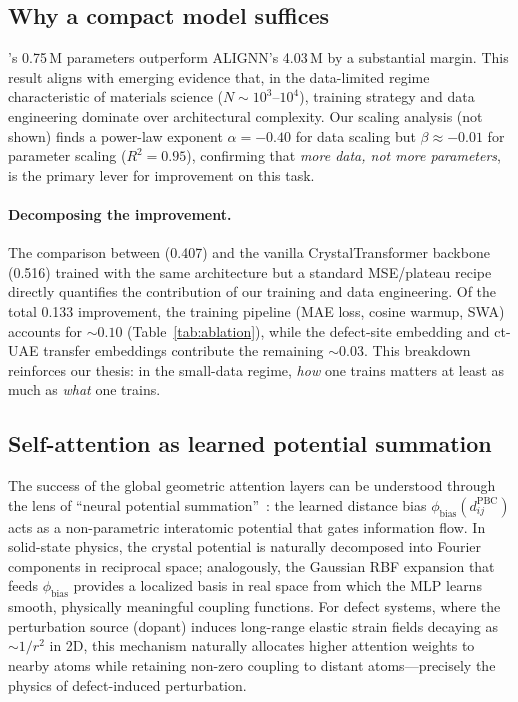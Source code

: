 
\subsection{Why a compact model suffices}

\dart{}'s 0.75\,M parameters outperform ALIGNN's 4.03\,M by a substantial
margin.
This result aligns with emerging evidence that, in the data-limited regime
characteristic of materials science ($N \sim 10^3$--$10^4$), training
strategy and data engineering dominate over architectural complexity.
Our scaling analysis (not shown) finds a power-law exponent
$\alpha = -0.40$ for data scaling but $\beta \approx -0.01$ for parameter
scaling ($R^2 = 0.95$), confirming that \emph{more data, not more
parameters}, is the primary lever for improvement on this task.

\paragraph{Decomposing the improvement.}
The comparison between \dart{} (0.407\eV{}) and the vanilla
CrystalTransformer backbone (0.516\eV{}) trained with the same
architecture but a standard MSE/plateau recipe directly quantifies the
contribution of our training and data engineering.
Of the total 0.133\eV{} improvement, the training pipeline
(MAE loss, cosine warmup, SWA) accounts for ${\sim}0.10$\eV{}
(Table~\ref{tab:ablation}), while the defect-site embedding and
ct-UAE transfer embeddings contribute the remaining
${\sim}0.03$\eV{}.
This breakdown reinforces our thesis: in the small-data regime,
\emph{how} one trains matters at least as much as \emph{what}
one trains.

\subsection{Self-attention as learned potential summation}

The success of the global geometric attention layers can be understood
through the lens of ``neural potential summation''~\cite{crystalformer2024}:
the learned distance bias $\phi_\mathrm{bias}(d_{ij}^{\mathrm{PBC}})$ acts
as a non-parametric interatomic potential that gates information flow.
In solid-state physics, the crystal potential is naturally decomposed into
Fourier components in reciprocal space; analogously, the Gaussian RBF
expansion that feeds $\phi_\mathrm{bias}$ provides a localized basis in
real space from which the MLP learns smooth, physically meaningful coupling
functions.
For defect systems, where the perturbation source (dopant) induces
long-range elastic strain fields decaying as ${\sim}1/r^2$ in 2D, this
mechanism naturally allocates higher attention weights to nearby atoms while
retaining non-zero coupling to distant atoms---precisely the physics of
defect-induced perturbation.

